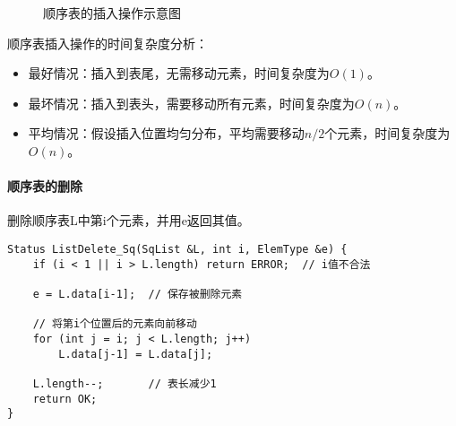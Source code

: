 \documentclass{../../note}
\begin{document}
\begin{figure}[h]
  \centering
  \caption{顺序表的插入操作示意图}
\end{figure}

顺序表插入操作的时间复杂度分析：
\begin{itemize}
  \item 最好情况：插入到表尾，无需移动元素，时间复杂度为$O(1)$。
  \item 最坏情况：插入到表头，需要移动所有元素，时间复杂度为$O(n)$。
  \item 平均情况：假设插入位置均匀分布，平均需要移动$n/2$个元素，时间复杂度为$O(n)$。
\end{itemize}

\paragraph{顺序表的删除}
删除顺序表L中第i个元素，并用e返回其值。

\begin{verbatim}
Status ListDelete_Sq(SqList &L, int i, ElemType &e) {
    if (i < 1 || i > L.length) return ERROR;  // i值不合法

    e = L.data[i-1];  // 保存被删除元素

    // 将第i个位置后的元素向前移动
    for (int j = i; j < L.length; j++)
        L.data[j-1] = L.data[j];

    L.length--;       // 表长减少1
    return OK;
}
\end{verbatim}
\end{document}
